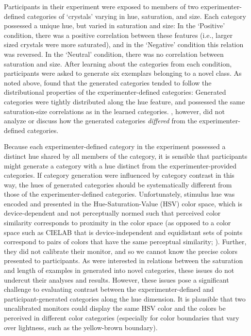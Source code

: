 \documentclass[12pt]{article}
\begin{document}
\begin{flushleft}
Participants in their experiment were exposed to members of two
experimenter-defined categories of `crystals' varying in hue, saturation, and
size. Each category possessed a unique hue, but varied in saturation and size:
In the `Positive' condition, there was a positive correlation between these
features (i.e., larger sized crystals were more saturated), and in the
`Negative' condition this relation was reversed. In the `Neutral' condition,
there was no correlation between saturation and size. After learning about the
categories from each condition, participants were asked to generate six
exemplars belonging to a novel class. As noted above,
\cite{jern2013probabilistic} found that the generated categories tended to
follow the distributional properties of the experimenter-defined categories:
Generated categories were tightly distributed along the hue feature, and
possessed the same saturation-size correlations as in the learned categories.
\cite{jern2013probabilistic}, however, did not analyze or discuss how the
generated categories {\em differed} from the experimenter-defined categories.

Because each experimenter-defined category in the \cite{jern2013probabilistic}
experiment possessed a distinct hue shared by all members of the category, it is
sensible that participants might generate a category with a hue distinct from
the experimenter-provided categories. If category generation were influenced by
category contrast in this way, the hues of generated categories should be
systematically different from those of the experimenter-defined categories.
Unfortunately, stimulus hue was encoded and presented in the
Hue-Saturation-Value (HSV) color space, which is device-dependent and not
perceptually normed such that perceived color similarity corresponds to
proximity in the color space (as opposed to a color space such as CIELAB that is
device-independent and equidistant sets of points correspond to pairs of colors
that have the same perceptual similarity; \citealp{wyszecki1967}). Further, they
did not calibrate their monitor, and so we cannot know the precise colors
presented to participants. As \cite{jern2013probabilistic} were interested in
relations between the saturation and length of examples in generated into novel
categories, these issues do not undercut their analyses and results. However,
these issues pose a significant challenge to evaluating contrast between the
experimenter-defined and participant-generated categories along the hue
dimension. It is plausible that two uncalibrated monitors could display the same
HSV color and the colors be perceived in different color categories (especially
for color boundaries that vary over lightness, such as the yellow-brown
boundary).


\end{flushleft}
\end{document}

